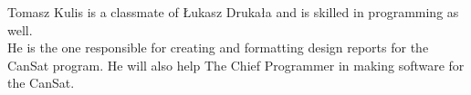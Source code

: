 \documentclass[class=report, crop=false]{standalone}
\begin{document}
Tomasz Kulis is a classmate of Łukasz Drukała and is skilled in programming as well. \\
He is the one responsible for creating and formatting design reports for the CanSat program.
He will also help The Chief Programmer in making software for the CanSat.
\end{document}
